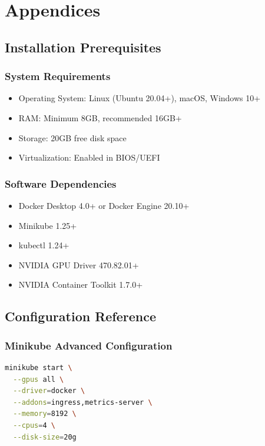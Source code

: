 \documentclass[12pt,a4paper]{report}
\begin{document}
\chapter{Appendices}
\label{chap:appendix}

\section{Installation Prerequisites}
\subsection{System Requirements}
\begin{itemize}
    \item Operating System: Linux (Ubuntu 20.04+), macOS, Windows 10+
    \item RAM: Minimum 8GB, recommended 16GB+
    \item Storage: 20GB free disk space
    \item Virtualization: Enabled in BIOS/UEFI
\end{itemize}

\subsection{Software Dependencies}
\begin{itemize}
    \item Docker Desktop 4.0+ or Docker Engine 20.10+
    \item Minikube 1.25+
    \item kubectl 1.24+
    \item NVIDIA GPU Driver 470.82.01+
    \item NVIDIA Container Toolkit 1.7.0+
\end{itemize}

\section{Configuration Reference}
\subsection{Minikube Advanced Configuration}
\begin{lstlisting}[language=bash,caption=Advanced Minikube Configuration,label=lst:minikube-config]
minikube start \
  --gpus all \
  --driver=docker \
  --addons=ingress,metrics-server \
  --memory=8192 \
  --cpus=4 \
  --disk-size=20g
\end{lstlisting}
\end{document}
